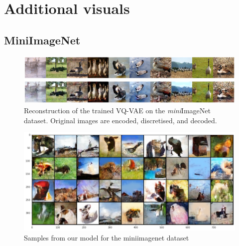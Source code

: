 \documentclass{article}
\theoremstyle{plain}
\theoremstyle{definition}
\theoremstyle{remark}
\begin{document}
 
\section{Additional visuals}\label{ap:additional_visuals}


\subsection{MiniImageNet}
\begin{figure}[!htb]
    \centering
    \includegraphics[width=0.9\linewidth]{./vqvae_miniImagenet_reconstruction.pdf}
    \caption{Reconstruction of the trained VQ-VAE on the \textit{mini}ImageNet dataset. Original images are encoded, discretised, and decoded.}
    \label{fig:miniimagenet_vqvae}
\end{figure}

\begin{figure}
    \centering
    \includegraphics[width=.8\linewidth]{./samples.pdf}
    \caption{Samples from our model for the miniimagenet dataset}
    \label{fig:miniimagenet_prior_ours2}
\end{figure}
\end{document}
